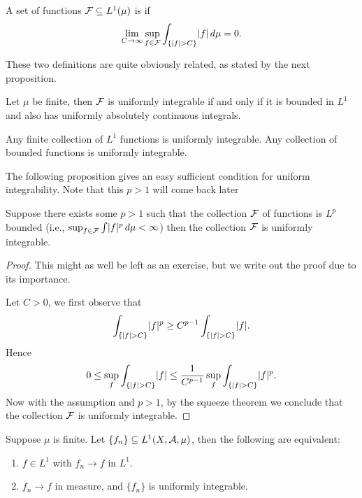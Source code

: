 \begin{defn}
    A set of functions $\mathcal{F}\subseteq L^1(\mu)$ is  if \[
        \lim_{C \to \infty} \sup_{f\in \mathcal{F}} \int_{\{\lvert f \rvert > C\}} \lvert f \rvert\,d\mu = 0.
    \]
\end{defn}

These two definitions are quite obviously related, as stated by the next proposition.

\begin{prop}
    Let $\mu$ be finite, then $\mathcal{F}$ is uniformly integrable if and only if it is bounded in $L^1$ and also has uniformly absolutely continuous integrals.
\end{prop}

\begin{fact}
    Any finite collection of $L^1$ functions is uniformly integrable. Any collection of bounded functions is uniformly integrable.
\end{fact}

The following proposition gives an easy sufficient condition for uniform integrability. Note that this $p > 1$ will come back later 

\begin{prop}
    Suppose there exists some $p > 1$ such that the collection $\mathcal{F}$ of functions is $L^p$ bounded (i.e., $\sup_{f\in \mathcal{F}} \int \lvert f \rvert^p \,d\mu <\infty$) then the collection $\mathcal{F}$ is uniformly integrable.
\end{prop}
\begin{proof}
    This might as well be left as an exercise, but we write out the proof due to its importance.

    Let $C > 0$, we first observe that \[
        \int_{\{\lvert f \rvert > C\}} \lvert f \rvert^p \geq C^{p-1} \int_{\{\lvert f \rvert > C\}} \lvert f \rvert.
    \] Hence \[
        0 \leq \sup_{f} \int_{\{\lvert f \rvert > C\}} \lvert f \rvert \leq \frac{1}{C^{p-1}}\sup_f\int_{\{\lvert f \rvert > C\}} \lvert f \rvert^p.
    \] Now with the assumption and $p > 1$, by the squeeze theorem we conclude that the collection $\mathcal{F}$ is uniformly integrable.
\end{proof}

\begin{namedthm}
    Suppose $\mu$ is finite. Let $\{f_n\} \subseteq L^1(X,\mathcal{A},\mu)$, then the following are equivalent: 
    \begin{enumerate}
        \item $f \in L^1$ with $f_n \to f$ in $L^1$.
        \item $f_n \to f$ in measure, and $\{f_n\}$ is uniformly integrable.
    \end{enumerate}
\end{namedthm}

